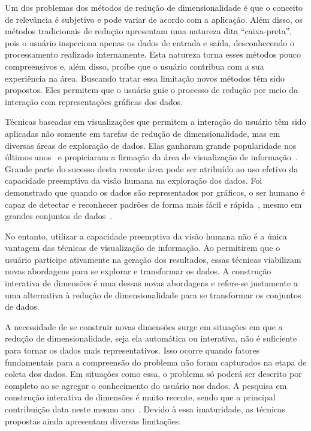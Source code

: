 Um dos problemas dos métodos de redução de dimensionalidade
é que o conceito de relevância é subjetivo e pode variar de
acordo com a aplicação. Além disso, os métodos tradicionais
de redução apresentam uma natureza dita ``caixa-preta'',
pois o usuário inspeciona apenas os dados de entrada e
saída, desconhecendo o processamento realizado internamente.
Esta natureza torna esses métodos pouco compreensivos e,
além disso, proíbe que o usuário contribua com a sua
experiência na área. Buscando tratar essa limitação novos
métodos têm sido propostos. Eles permitem que o usuário
guie o processo de redução por meio da interação com
representações gráficas dos dados.

Técnicas baseadas em visualizações que permitem a
interação do usuário têm sido aplicadas não somente em
tarefas de redução de dimensionalidade, mas em diversas
áreas de exploração de dados. Elas ganharam grande
popularidade nos últimos anos~\cite{State2012} e propiciaram
a firmação da área de visualização de
informação~\cite{Keim2002}. Grande parte do sucesso desta
recente área pode ser atribuído ao uso efetivo da capacidade
preemptiva da visão humana na exploração dos dados. Foi
demonstrado que quando os dados são representados por 
gráficos, o ser humano é capaz de detectar e reconhecer
padrões de forma mais fácil e rápida~\cite{Healey1995},
mesmo em grandes conjuntos de dados~\cite{Fodor2002}. 

No entanto, utilizar a capacidade preemptiva da visão humana
não é a única vantagem das técnicas de visualização de
informação. Ao permitirem que o usuário participe ativamente
na geração dos resultados, essas técnicas viabilizam novas
abordagens para se explorar e transformar os dados. A
construção interativa de dimensões é uma dessas novas
abordagens e refere-se justamente a uma alternativa à
redução de dimensionalidade para se transformar os conjuntos
de dados.

A necessidade de se construir novas dimensões surge em
situações em que a redução de dimensionalidade, seja ela
automática ou interativa, não é suficiente para tornar os
dados mais representativos. Isso ocorre quando fatores
fundamentais para a compreensão do problema não foram
capturados na etapa de coleta dos dados. Em situações como
essa, o problema só poderá ser descrito por completo ao se
agregar o conhecimento do usuário nos dados. A pesquisa em
construção interativa de dimensões é muito recente, sendo
que a principal contribuição data neste mesmo
ano~\cite{Gladys2013}. Devido à essa imaturidade, as
técnicas propostas ainda apresentam diversas limitações. 


